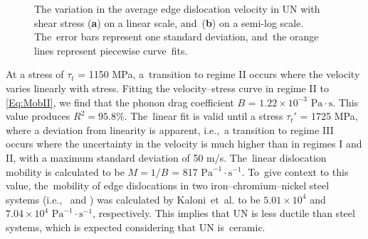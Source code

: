 \documentclass[applsci,article,accept,pdftex,moreauthors]{Definitions/mdpi}
\newcommand{\?}{\stackrel{?}{=}}
\begin{document}
\begin{figure}[H]
{\captionsetup{position=bottom,justification=centering}
\hfill
{}
}
\caption{The variation in the average edge dislocation velocity in UN with shear stress (\textbf{a}) on a linear scale, and~(\textbf{b}) on a semi-log scale. The~error bars represent one standard deviation, and~the orange lines represent piecewise curve~fits.}
\label{Fig:DislocPosTime}
\end{figure}


At a stress of $\tau_t$ = 1150 MPa, a~transition to regime II occurs where the velocity varies linearly with stress. Fitting the velocity--stress curve in regime II to \cref{Eq:MobII}, we find that the phonon drag coefficient $B$ = $1.22 \times 10^{-3}$ $\mathrm{Pa} \! \cdot \! \mathrm{s}$. This value produces $R^2 = 95.8\%$. The~linear fit is valid until a stress $\tau_t'$ = 1725 MPa, where a deviation from linearity is apparent, i.e.,~a transition to regime III occurs where the uncertainty in the velocity is much higher than in regimes I and II, with a maximum standard deviation of 50 m/s. The~linear dislocation mobility is calculated to be $M = 1/B$ = 817 $\mathrm{Pa}^{-1} \! \cdot \! \mathrm{s}^{-1}$. To~give context to this value, the~mobility of edge dislocations in two iron--chromium--nickel steel systems \mbox{(i.e., } and ) was calculated by Kaloni~et~al. \cite{Kaloni2023} to be $5.01 \times 10^4$ and $7.04 \times 10^4$ $\mathrm{Pa}^{-1} \! \cdot \! \mathrm{s}^{-1}$, respectively. This implies that UN is less ductile than steel systems, which is expected considering that UN is~ceramic.
\end{document}
